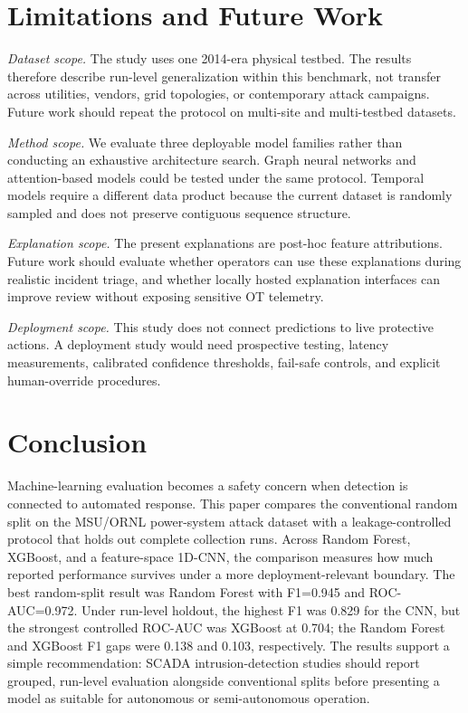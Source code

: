 \documentclass[conference,a4paper]{IEEEtran}
\begin{document}
\section{Limitations and Future Work}
\label{sec:limitations}

\textit{Dataset scope.} The study uses one 2014-era physical testbed. The results therefore describe run-level generalization within this benchmark, not transfer across utilities, vendors, grid topologies, or contemporary attack campaigns. Future work should repeat the protocol on multi-site and multi-testbed datasets.

\textit{Method scope.} We evaluate three deployable model families rather than conducting an exhaustive architecture search. Graph neural networks and attention-based models could be tested under the same protocol. Temporal models require a different data product because the current dataset is randomly sampled and does not preserve contiguous sequence structure.

\textit{Explanation scope.} The present explanations are post-hoc feature attributions. Future work should evaluate whether operators can use these explanations during realistic incident triage, and whether locally hosted explanation interfaces can improve review without exposing sensitive OT telemetry.

\textit{Deployment scope.} This study does not connect predictions to live protective actions. A deployment study would need prospective testing, latency measurements, calibrated confidence thresholds, fail-safe controls, and explicit human-override procedures.

\section{Conclusion}

Machine-learning evaluation becomes a safety concern when detection is connected to automated response. This paper compares the conventional random split on the MSU/ORNL power-system attack dataset with a leakage-controlled protocol that holds out complete collection runs. Across Random Forest, XGBoost, and a feature-space 1D-CNN, the comparison measures how much reported performance survives under a more deployment-relevant boundary. The best random-split result was Random Forest with F1=0.945 and ROC-AUC=0.972. Under run-level holdout, the highest F1 was 0.829 for the CNN, but the strongest controlled ROC-AUC was XGBoost at 0.704; the Random Forest and XGBoost F1 gaps were 0.138 and 0.103, respectively. The results support a simple recommendation: SCADA intrusion-detection studies should report grouped, run-level evaluation alongside conventional splits before presenting a model as suitable for autonomous or semi-autonomous operation.



\end{document}
